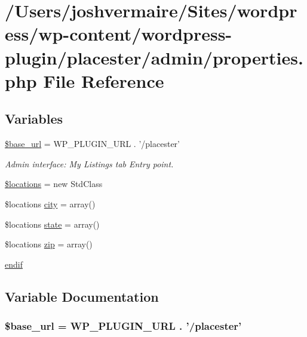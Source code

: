 \hypertarget{properties_8php}{
\section{/Users/joshvermaire/Sites/wordpress/wp-\/content/wordpress-\/plugin/placester/admin/properties.php File Reference}
\label{d1/d24/properties_8php}
}
\subsection*{Variables}
\begin{DoxyCompactItemize}
\item 
\hyperlink{properties_8php_a6886427c9c643f707fcb35c018049bc7}{\$base\_\-url} = WP\_\-PLUGIN\_\-URL . '/placester'
\begin{DoxyCompactList}\small\item\em Admin interface: My Listings tab Entry point. \end{DoxyCompactList}\item 
\hyperlink{properties_8php_ad6ba91f5c932dec6e72487c45999806b}{\$locations} = new StdClass
\item 
\$locations \hyperlink{properties_8php_a81b620099d28285c6dc9391225c76809}{city} = array()
\item 
\$locations \hyperlink{properties_8php_a06476ede5bee8fe1a2ef2028da373fdd}{state} = array()
\item 
\$locations \hyperlink{properties_8php_a39bc6b1556dfe61e150b5f57a61f084d}{zip} = array()
\item 
\hyperlink{properties_8php_a82cd33ca97ff99f2fcc5e9c81d65251b}{endif}
\end{DoxyCompactItemize}


\subsection{Variable Documentation}
\hypertarget{properties_8php_a6886427c9c643f707fcb35c018049bc7}{
\subsubsection[{\$base\_\-url}]{\setlength{\rightskip}{0pt plus 5cm}\$base\_\-url = WP\_\-PLUGIN\_\-URL . '/placester'}}
\label{d1/d24/properties_8php_a6886427c9c643f707fcb35c018049bc7}



